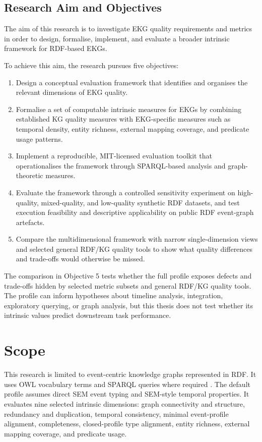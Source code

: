 \subsection{Research Aim and Objectives}

The aim of this research is to investigate EKG quality requirements and metrics in order to design, formalise, implement, and evaluate a broader intrinsic framework for RDF-based EKGs.

To achieve this aim, the research pursues five objectives:

\begin{enumerate}
    \item Design a conceptual evaluation framework that identifies and organises the relevant dimensions of EKG quality.
    \item Formalise a set of computable intrinsic measures for EKGs by combining established KG quality measures with EKG-specific measures such as temporal density, entity richness, external mapping coverage, and predicate usage patterns.
    \item Implement a reproducible, MIT-licensed evaluation toolkit that operationalises the framework through SPARQL-based analysis and graph-theoretic measures.
    \item Evaluate the framework through a controlled sensitivity experiment on high-quality, mixed-quality, and low-quality synthetic RDF datasets, and test execution feasibility and descriptive applicability on public RDF event-graph artefacts.
    \item Compare the multidimensional framework with narrow single-dimension views and selected general RDF/KG quality tools to show what quality differences and trade-offs would otherwise be missed.
\end{enumerate}

The comparison in Objective 5 tests whether the full profile exposes defects and trade-offs hidden by selected metric subsets and general RDF/KG quality tools. The profile can inform hypotheses about timeline analysis, integration, exploratory querying, or graph analysis, but this thesis does not test whether its intrinsic values predict downstream task performance.

\section{Scope}

This research is limited to event-centric knowledge graphs represented in RDF. It uses OWL vocabulary terms and SPARQL queries where required \citep{rdf11concepts2014,owl2overview2012,sparql11query2013}. The default profile assumes direct SEM event typing and SEM-style temporal properties. It evaluates nine selected intrinsic dimensions: graph connectivity and structure, redundancy and duplication, temporal consistency, minimal event-profile alignment, completeness, closed-profile type alignment, entity richness, external mapping coverage, and predicate usage.

